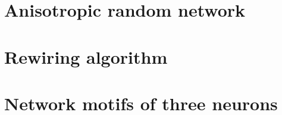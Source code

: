 \documentclass[10pt, a4paper]{article}
\begin{document}


\section{Anisotropic random network}



\clearpage
\newpage

\section{Rewiring algorithm}


\clearpage
\newpage

\section{Network motifs of three neurons}



\end{document}

